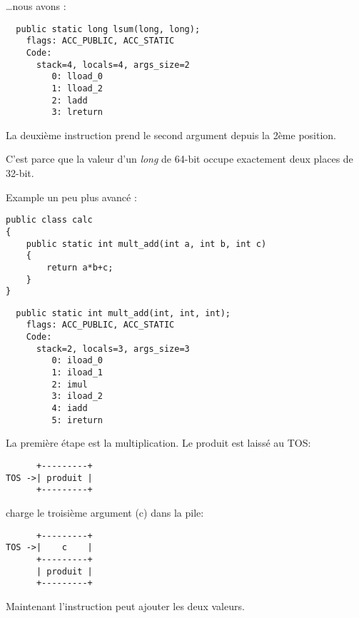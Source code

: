 \dots nous avons :

\begin{lstlisting}
  public static long lsum(long, long);
    flags: ACC_PUBLIC, ACC_STATIC
    Code:
      stack=4, locals=4, args_size=2
         0: lload_0       
         1: lload_2       
         2: ladd          
         3: lreturn       
\end{lstlisting}

La deuxième instruction  prend le second argument depuis la 2ème position.

C'est parce que la valeur d'un \emph{long} de 64-bit occupe exactement deux places de 32-bit.


Example un peu plus avancé :


\begin{lstlisting}[style=customjava]
public class calc
{
	public static int mult_add(int a, int b, int c)
	{
		return a*b+c;
	}
}
\end{lstlisting}

\begin{lstlisting}
  public static int mult_add(int, int, int);
    flags: ACC_PUBLIC, ACC_STATIC
    Code:
      stack=2, locals=3, args_size=3
         0: iload_0       
         1: iload_1       
         2: imul          
         3: iload_2       
         4: iadd          
         5: ireturn       
\end{lstlisting}

La première étape est la multiplication. Le produit est laissé au \ac{TOS}:


\begin{lstlisting}
      +---------+
TOS ->| produit |
      +---------+
\end{lstlisting}

 charge le troisième argument (c) dans la pile:

\begin{lstlisting}
      +---------+
TOS ->|    c    |
      +---------+
      | produit |
      +---------+
\end{lstlisting}

Maintenant l'instruction  peut ajouter les deux valeurs.

